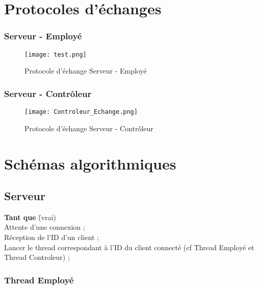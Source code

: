 \section{Protocoles d'échanges}

\subsubsection{Serveur - Employé}

\begin{center}
\begin{figure}[H] \centering
\texttt{[image: test.png]}\\
\caption{\label{Employe_Scenario} Protocole d'échange Serveur - Employé}
\end{figure}
\end{center}


\subsubsection{Serveur - Contrôleur}

\begin{center}
\begin{figure}[H] \centering
\texttt{[image: Controleur\_Echange.png]}\\
\caption{\label{Controleur_Echange} Protocole d'échange Serveur - Contrôleur }
\end{figure}
\end{center}

\section{Schémas algorithmiques}
\subsection{Serveur}
\begin{tabbing}
\= \textbf{Tant que} \= (vrai)\\
	\>	\> Attente d'une connexion ;\\
	\>  \> Réception de l'ID d'un client ;\\
	\>	\> Lancer le thread correspondant à l'ID du client connecté    (cf Thread Employé et Thread Controleur) ;
\end{tabbing}

\subsubsection{Thread Employé}

